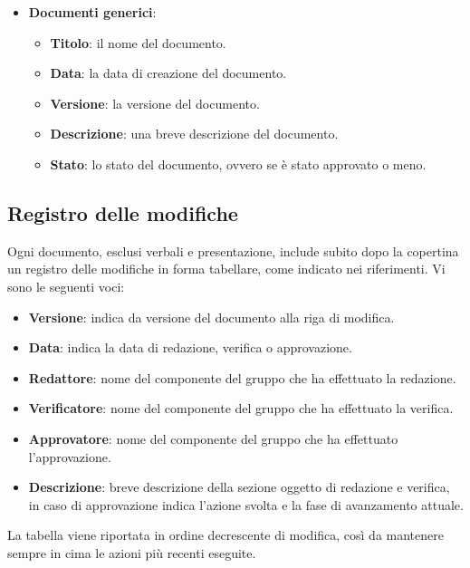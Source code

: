 \begin{itemize}
	\item \textbf{Documenti generici}:
	      \begin{itemize}
		      \item \textbf{Titolo}: il nome del documento.
		      \item \textbf{Data}: la data di creazione del documento.
		      \item \textbf{Versione}: la versione del documento.
		      \item \textbf{Descrizione}: una breve descrizione del documento.
		      \item \textbf{Stato}: lo stato del documento, ovvero se è stato
		            approvato o meno.
	      \end{itemize}

\end{itemize}

\subsection{Registro delle modifiche}
\label{documentazione_registromodifiche}
Ogni documento, esclusi verbali e presentazione, include subito dopo la
copertina un registro delle modifiche in forma tabellare, come indicato nei
riferimenti.
Vi sono le seguenti voci:
\begin{itemize}
	\item \textbf{Versione}: indica da versione del documento alla riga di
	      modifica.
	\item \textbf{Data}: indica la data di redazione, verifica o approvazione.
	\item \textbf{Redattore}: nome del componente del gruppo che ha effettuato
	      la redazione.
	\item \textbf{Verificatore}: nome del componente del gruppo che ha
	      effettuato la verifica.
	\item \textbf{Approvatore}: nome del componente del gruppo che ha effettuato
	      l'approvazione.
	\item \textbf{Descrizione}: breve descrizione della sezione oggetto di
	      redazione e verifica, in caso di approvazione indica l'azione svolta e
	      la fase di avanzamento attuale.
\end{itemize}
\noindent
La tabella viene riportata in ordine decrescente di modifica, così da mantenere
sempre in cima le azioni più recenti eseguite.

